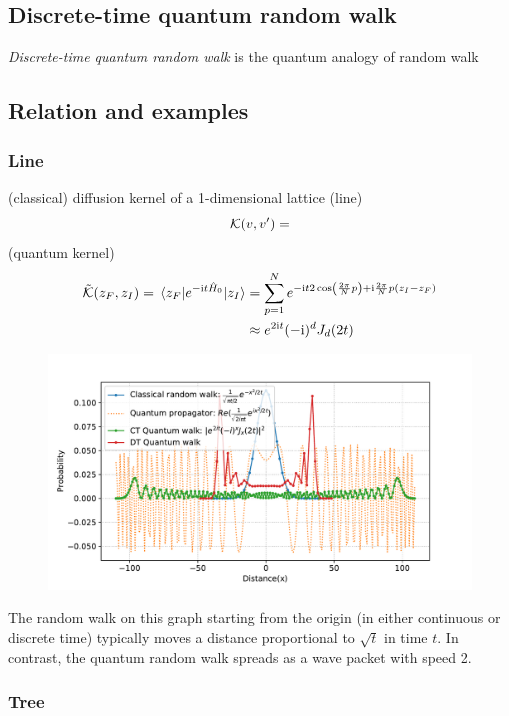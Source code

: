 \subsection{Discrete-time quantum random walk}
\emph{Discrete-time quantum random walk} is the quantum analogy of random walk

\subsection{Relation and examples}
\subsubsection{Line}
(classical) diffusion kernel of a 1-dimensional lattice (line)
\begin{equation}
	\mathcal{K}(v,v') = 
\end{equation}
 (quantum kernel)
\begin{align}
	\tilde{\mathcal{K}}(z_F,z_I) = 
	\mel{z_F}{e^{-\textup{i}t\hat{H}_0 }}{z_I}
	&=\sum_{p=1}^{N} 
	e^{-\textup{i} t 2\cos(\frac{2\pi}{N}p) +\textup{i} \frac{2\pi}{N} p(z_I-z_F)} 
	\\
	&
	\approx e^{2\textup{i} t} (-\textup{i})^{d} J_{d} (2t)
	\label{eq:ctqrw_kernel}
\end{align}
\begin{figure}[!ht]
	\centering
	\includegraphics[width=.7\linewidth]{walk_propagator_1d.pdf}
	\caption{}
\end{figure}
\begin{remark}
    The random walk on this graph starting from the origin (in either continuous or discrete time)
    typically moves a distance proportional to $\sqrt{t}$ in time $t$.
	In contrast, the quantum random walk spreads as a wave packet with speed 2.
\end{remark}

\subsubsection{Tree}
